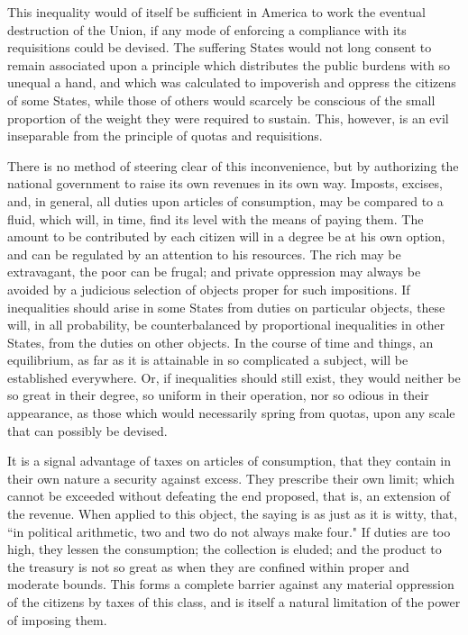 This inequality would of itself be sufficient in America to work the eventual destruction of the Union, if any mode of enforcing a compliance with its requisitions could be devised. 
The suffering States would not long consent to remain associated upon a principle which distributes the public burdens with so unequal a hand, and which was calculated to impoverish and oppress the citizens of some States, while those of others would scarcely be conscious of the small proportion of the weight they were required to sustain. 
This, however, is an evil inseparable from the principle of quotas and requisitions.

There is no method of steering clear of this inconvenience, but by authorizing the national government to raise its own revenues in its own way. 
Imposts, excises, and, in general, all duties upon articles of consumption, may be compared to a fluid, which will, in time, find its level with the means of paying them. 
The amount to be contributed by each citizen will in a degree be at his own option, and can be regulated by an attention to his resources. 
The rich may be extravagant, the poor can be frugal; and private oppression may always be avoided by a judicious selection of objects proper for such impositions. 
If inequalities should arise in some States from duties on particular objects, these will, in all probability, be counterbalanced by proportional inequalities in other States, from the duties on other objects. 
In the course of time and things, an equilibrium, as far as it is attainable in so complicated a subject, will be established everywhere. 
Or, if inequalities should still exist, they would neither be so great in their degree, so uniform in their operation, nor so odious in their appearance, as those which would necessarily spring from quotas, upon any scale that can possibly be devised.

It is a signal advantage of taxes on articles of consumption, that they contain in their own nature a security against excess. 
They prescribe their own limit; which cannot be exceeded without defeating the end proposed, that is, an extension of the revenue. 
When applied to this object, the saying is as just as it is witty, that, ``in political arithmetic, two and two do not always make four." If duties are too high, they lessen the consumption; the collection is eluded; and the product to the treasury is not so great as when they are confined within proper and moderate bounds. 
This forms a complete barrier against any material oppression of the citizens by taxes of this class, and is itself a natural limitation of the power of imposing them.

